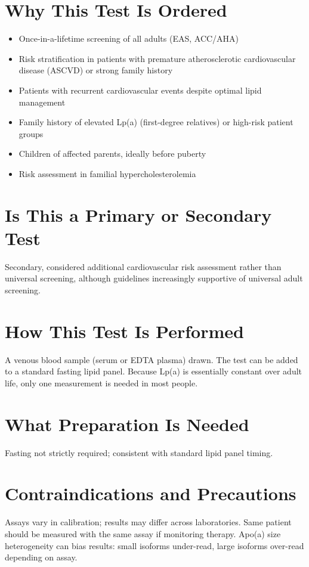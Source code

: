 \section*{Why This Test Is Ordered}
\begin{itemize}
  \item Once-in-a-lifetime screening of all adults (EAS, ACC/AHA)
  \item Risk stratification in patients with premature atherosclerotic cardiovascular disease (ASCVD) or strong family history
  \item Patients with recurrent cardiovascular events despite optimal lipid management
  \item Family history of elevated Lp(a) (first-degree relatives) or high-risk patient groups
  \item Children of affected parents, ideally before puberty
  \item Risk assessment in familial hypercholesterolemia
\end{itemize}

\section*{Is This a Primary or Secondary Test}
Secondary, considered additional cardiovascular risk assessment rather than universal screening, although guidelines increasingly supportive of universal adult screening.

\section*{How This Test Is Performed}
A venous blood sample (serum or EDTA plasma) drawn. The test can be added to a standard fasting lipid panel. Because Lp(a) is essentially constant over adult life, only one measurement is needed in most people.

\section*{What Preparation Is Needed}
Fasting not strictly required; consistent with standard lipid panel timing.

\section*{Contraindications and Precautions}
Assays vary in calibration; results may differ across laboratories. Same patient should be measured with the same assay if monitoring therapy. Apo(a) size heterogeneity can bias results: small isoforms under-read, large isoforms over-read depending on assay.

